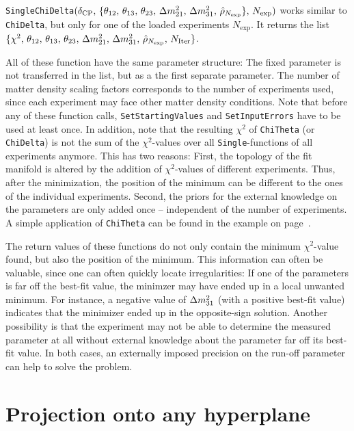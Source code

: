 \begin{function}
{\tt SingleChiDelta}$( \delta_{\mathrm{CP}}, \, \{ \theta_{12}, \, \theta_{13}, \, \theta_{23}, \, \Delta m_{21}^2 , \, \Delta m_{31}^2, \,  \hat{\rho}_{N_{\mathrm{exp}}} \}, \, N_{\mathrm{exp}})$ works similar to {\tt ChiDelta}, but only for one of the loaded experiments $N_{\mathrm{exp}}$. It returns the list $\{ \chi^2, \, \theta_{12}, \,  \theta_{13}, \,  \theta_{23}, \, \Delta m_{21}^2 , \, \Delta m_{31}^2, \, \hat{\rho}_{N_{\mathrm{exp}}} , \, N_{\mathrm{Iter}} \}$.
\end{function}
All of these function have the same parameter structure: The fixed parameter is not transferred in the list, but as a the first separate parameter. The number of matter density scaling factors corresponds to the number of experiments used, since each experiment may face other matter density conditions. Note that before any of these function calls, {\tt SetStartingValues} and {\tt SetInputErrors} have to be used at least once. In addition, note that the resulting $\chi^2$ of {\tt ChiTheta} (or {\tt ChiDelta}) is not the sum of the $\chi^2$-values over all {\tt Single}-functions of all experiments anymore. This has two reasons: First, the topology of the fit manifold is altered by the addition of $\chi^2$-values of different experiments. Thus, after the minimization, the position of the minimum can be different to the ones of the individual experiments. Second, the priors for the external knowledge on the parameters are only added once -- independent of the number of experiments. A simple application of {\tt ChiTheta} can be found in the example on page~\pageref{ex:corrproj}. 

The return values of these functions do not only contain the minimum $\chi^2$-value found, but also the position of the minimum. This information can often be valuable, since one can often quickly locate irregularities: If one of the parameters is far off the best-fit value, the minimzer may have ended up in a local unwanted minimum. For instance, a negative value of $\Delta m_{31}^2$ (with a positive best-fit value) indicates that the minimizer ended up in the opposite-sign solution. Another possibility is that the experiment may not be able to determine the measured parameter at all without external knowledge about the parameter far off its best-fit value. In both cases, an externally imposed precision on the run-off parameter can help to solve the problem. 

\section[Projection onto any hyperplane]{Projection onto any  hyperplane}

